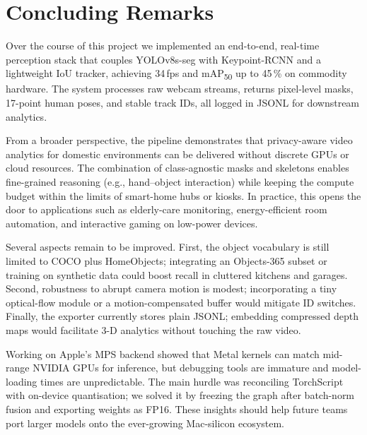 \section{Concluding Remarks}

Over the course of this project we implemented an end-to-end, real-time
perception stack that couples YOLOv8s-seg with Keypoint-RCNN and a lightweight
IoU tracker, achieving 34\,fps and mAP\textsubscript{50} up to 45\,\% on
commodity hardware. The system processes raw webcam streams, returns
pixel-level masks, 17-point human poses, and stable track IDs, all logged in
JSONL for downstream analytics.

From a broader perspective, the pipeline demonstrates that privacy-aware video
analytics for domestic environments can be delivered without discrete GPUs or
cloud resources. The combination of class-agnostic masks and skeletons enables
fine-grained reasoning (e.g., hand–object interaction) while keeping the
compute budget within the limits of smart-home hubs or kiosks. In practice,
this opens the door to applications such as elderly-care monitoring,
energy-efficient room automation, and interactive gaming on low-power devices.

Several aspects remain to be improved. First, the object vocabulary is still
limited to COCO plus HomeObjects; integrating an Objects-365 subset or training
on synthetic data could boost recall in cluttered kitchens and garages.
Second, robustness to abrupt camera motion is modest; incorporating a tiny
optical-flow module or a motion-compensated buffer would mitigate ID switches.
Finally, the exporter currently stores plain JSONL; embedding compressed depth
maps would facilitate 3-D analytics without touching the raw video.

Working on Apple’s MPS backend showed that Metal kernels can match mid-range
NVIDIA GPUs for inference, but debugging tools are immature and model-loading
times are unpredictable. The main hurdle was reconciling TorchScript with
on-device quantisation; we solved it by freezing the graph after batch-norm
fusion and exporting weights as FP16. These insights should help future teams
port larger models onto the ever-growing Mac-silicon ecosystem.